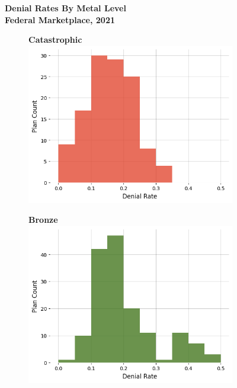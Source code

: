 \documentclass[12pt, a4paper,twoside,parskip=full]{report}
\theoremstyle{plain} %
\theoremstyle{definition} %
\theoremstyle{remark} %
\numberwithin{equation}{chapter}
\begin{document}
			\clearpage
			
			
			\begin{figure}
				\centering
				\textbf{Denial Rates By Metal Level}\\ 
				\textbf{Federal Marketplace, 2021}\\
				\vspace{3em}
				\centering
				\begin{subfigure}[t]{0.49\textwidth}
					\centering
					\textbf{Catastrophic}
					\includegraphics[width=\textwidth]{images/cms_puf/Catastrophic_dist.png}
				\end{subfigure}
				\hfill
				\begin{subfigure}[t]{0.49\textwidth}
					\centering
					\textbf{Bronze}
					\includegraphics[width=\textwidth]{images/cms_puf/Bronze_dist.png}

\end{subfigure}
\end{figure}
\end{document}

